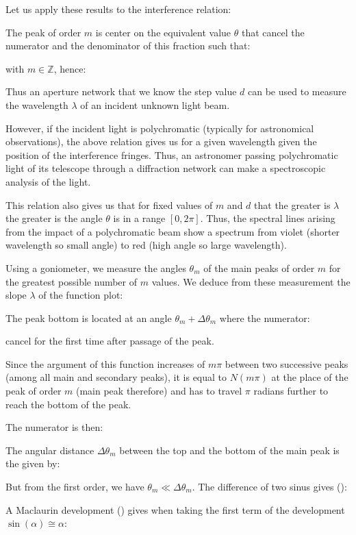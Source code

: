 	Let us apply these results to the interference relation:
	
	The peak of order $m$ is center on the equivalent value $\theta$ that cancel the numerator and the denominator of this fraction such that:
	
	with $m\in\mathbb{Z}$, hence:
	
	Thus an aperture network that we know the step value $d$ can be used to measure the wavelength $\lambda$ of an incident unknown light beam.
	
	However, if the incident light is polychromatic (typically for astronomical observations), the above relation gives us for a given wavelength given the position of the interference fringes. Thus, an astronomer passing polychromatic light of its telescope through a diffraction network can make a spectroscopic analysis of the light.

	This relation also gives us that for fixed values of $m$ and $d$ that the greater is $\lambda$ the greater is the angle $\theta$ is in a range $[0,2\pi]$. Thus, the spectral lines arising from the impact of a polychromatic beam show a spectrum from violet (shorter wavelength so small angle) to red (high angle so large wavelength).

	Using a goniometer, we measure the angles $\theta_m$ of the main peaks of order $m$ for the greatest possible number of $m$ values. We deduce from these measurement the slope $\lambda$ of the function plot:
	
	The peak bottom is located at an angle $\theta_m+\Delta\theta_m$ where the numerator:
	
	cancel for the first time after passage of the peak.
	
	Since the argument of this function increases of $m\pi$ between two successive peaks (among all main and secondary peaks), it is equal to $N(m\pi)$ at the place of the peak of order $m$ (main peak therefore) and has to travel $\pi$ radians further to reach the bottom of the peak.

	The numerator is then:
	
	The angular distance $\Delta \theta_m$ between the top and the bottom of the main peak is the given by:
	
	But from the first order, we have $\theta_m \ll \Delta\theta_m$. The difference of two sinus gives ():
	
	A Maclaurin development () gives when taking the first term of the development $\sin(\alpha)\cong \alpha$:
	
